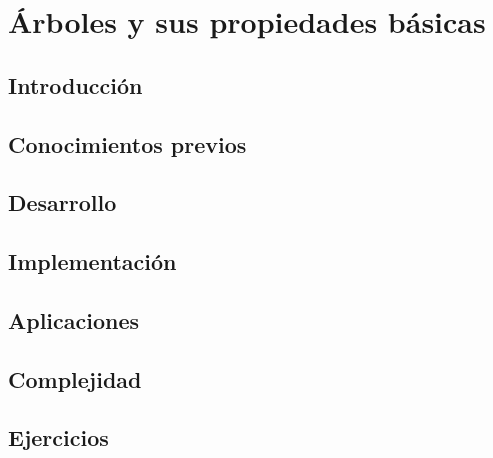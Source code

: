 \chapter{Árboles y sus propiedades básicas}
\section{Introducción}

\section{Conocimientos previos}

\section{Desarrollo}

\section{Implementación}

\section{Aplicaciones}

\section{Complejidad}

\section{Ejercicios}
